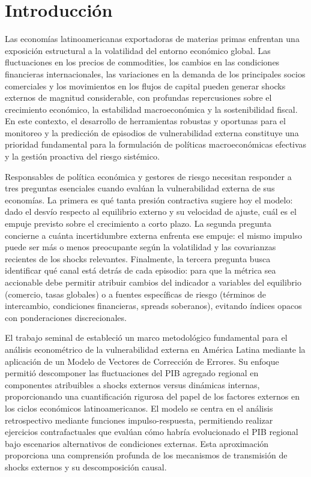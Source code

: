 \documentclass[3p,11pt,draft,natbib=false]{elsarticle}
\begin{document}

\section{Introducción}
\label{sec:intro}

Las economías latinoamericanas exportadoras de materias primas enfrentan una exposición estructural a la volatilidad del entorno económico global. Las fluctuaciones en los precios de commodities, los cambios en las condiciones financieras internacionales, las variaciones en la demanda de los principales socios comerciales y los movimientos en los flujos de capital pueden generar shocks externos de magnitud considerable, con profundas repercusiones sobre el crecimiento económico, la estabilidad macroeconómica y la sostenibilidad fiscal. En este contexto, el desarrollo de herramientas robustas y oportunas para el monitoreo y la predicción de episodios de vulnerabilidad externa constituye una prioridad fundamental para la formulación de políticas macroeconómicas efectivas y la gestión proactiva del riesgo sistémico.

Responsables de política económica y gestores de riesgo necesitan responder a tres preguntas esenciales cuando evalúan la vulnerabilidad externa de sus economías. La primera es qué tanta presión contractiva sugiere hoy el modelo: dado el desvío respecto al equilibrio externo y su velocidad de ajuste, cuál es el empuje previsto sobre el crecimiento a corto plazo. La segunda pregunta concierne a cuánta incertidumbre externa enfrenta ese empuje: el mismo impulso puede ser más o menos preocupante según la volatilidad y las covarianzas recientes de los shocks relevantes. Finalmente, la tercera pregunta busca identificar qué canal está detrás de cada episodio: para que la métrica sea accionable debe permitir atribuir cambios del indicador a variables del equilibrio (comercio, tasas globales) o a fuentes específicas de riesgo (términos de intercambio, condiciones financieras, spreads soberanos), evitando índices opacos con ponderaciones discrecionales.

El trabajo seminal de \citet{izquierdo2008booms} estableció un marco metodológico fundamental para el análisis econométrico de la vulnerabilidad externa en América Latina mediante la aplicación de un Modelo de Vectores de Corrección de Errores. Su enfoque permitió descomponer las fluctuaciones del PIB agregado regional en componentes atribuibles a shocks externos versus dinámicas internas, proporcionando una cuantificación rigurosa del papel de los factores externos en los ciclos económicos latinoamericanos. El modelo se centra en el análisis retrospectivo mediante funciones impulso-respuesta, permitiendo realizar ejercicios contrafactuales que evalúan cómo habría evolucionado el PIB regional bajo escenarios alternativos de condiciones externas. Esta aproximación proporciona una comprensión profunda de los mecanismos de transmisión de shocks externos y su descomposición causal.
\end{document}
